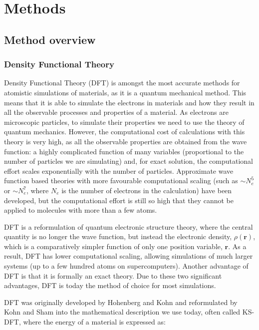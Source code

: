 \documentclass[../main.tex]{subfiles}
\begin{document}
\section{Methods}
\subsection{Method overview}
\label{sec:methods}

\subsubsection{Density Functional Theory}
\label{sec:dft}
Density Functional Theory (DFT) is amongst the most accurate methods for atomistic simulations of materials, as it is a quantum mechanical method. This means that it is able to simulate the electrons in materials and how they result in all the observable processes and properties of a  material. As electrons are microscopic particles, to simulate their properties we need to use the theory of quantum mechanics. However, the computational cost of calculations with this theory is very high, as all the observable properties are obtained from the wave function: a highly complicated function of many variables (proportional to the number of particles we are simulating) and, for exact solution, the computational effort scales exponentially with the number of particles. Approximate wave function based theories with more favourable computational scaling (such as $\sim N_e^5$ or $\sim N_e^7$, where $N_e$ is the number of electrons in the calculation) have been developed, but the computational effort is still so high that they cannot be applied to molecules with more than a few atoms.

DFT is a reformulation of quantum electronic structure theory, where the central quantity is no longer the wave function, but instead the electronic density, $\rho(\mathbf{r})$, which is a comparatively simpler function of only one position variable, $\mathbf{r}$. As a result, DFT has lower computational scaling, allowing simulations of much larger systems (up to a few hundred atoms on supercomputers). Another advantage of DFT is that it is formally an exact theory. Due to these two significant advantages, DFT is today the method of choice for most simulations.

DFT was originally developed by Hohenberg and Kohn \cite{parr,ph1964B864} and reformulated by Kohn and Sham \cite{wk1965A1133} into the mathematical description we use today, often called KS-DFT, where the energy of a material is expressed as:
\end{document}
